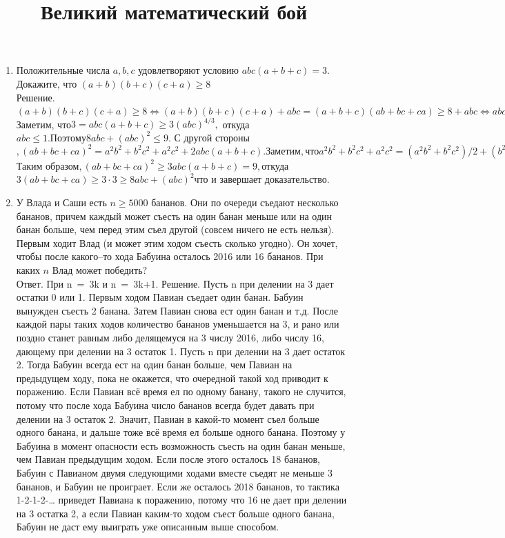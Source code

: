 \documentclass{article}
\title{Великий математический бой}
\date{}
\begin{document}
	\maketitle
	\pagestyle{empty}
	\begin{enumerate}
		\item Положительные числа $a, b, c$ удовлетворяют условию $abc(a+b+c) = 3$. Докажите, что $(a+b)(b+c)(c+a) \ge 8$ \\
		Решение. $(a+b)(b+c)(c+a) \ge  8 \Leftrightarrow (a+b)(b+c)(c+a)+abc = (a+b+c)(ab+bc+ca) \ge 8+abc \Leftrightarrow abc(a+b+c)(ab+bc+ca) = 3(ab+bc+ca) \ge 8abc+(abc)^2.$ Заметим, что$  3 = abc(a+b+c) \ge 3(abc)^{4/3},$ откуда $abc \le 1. Поэтому 8abc+(abc)^2 \le 9.$ С другой стороны$, (ab+bc+ca)^2 = a^2b^2+b^2c^2+a^2c^2+2abc(a+b+c). Заметим, что a^2b^2+b^2c^2+a^2c^2 = (a^2b^2+b^2c^2)/2+(b^2c^2+a^2c^2)/2+(a^2b^2+a^2c^2)/2 \ge ab^2c+bc^2a+ca^2b = abc(a+b+c). $Таким образом$, (ab+bc+ca)^2 \ge 3abc(a+b+c) = 9, $откуда$ 3(ab+bc+ca) \ge 3 \cdot 3 \ge 8abc+ (abc)^2 $что и завершает доказательство.
		\item У Влада и Саши есть $n \ge 5000$ бананов. Они по очереди съедают несколько бананов, причем каждый может съесть на один банан меньше или на один банан больше, чем перед этим съел другой (совсем ничего не есть нельзя). Первым ходит Влад (и может этим ходом съесть сколько угодно). Он хочет, чтобы после какого–то хода Бабуина осталось 2016 или 16 бананов. При каких $n$ Влад может победить?\\
		Ответ. При n = 3k и n = 3k+1. Решение. Пусть n при делении на 3 дает остатки 0 или 1. Первым ходом Павиан съедает один банан. Бабуин вынужден съесть 2 банана. Затем Павиан снова ест один банан и т.д. После каждой пары таких ходов количество бананов уменьшается на 3, и рано или поздно станет равным либо делящемуся на 3 числу 2016, либо числу 16, дающему при делении на 3 остаток 1. Пусть n при делении на 3 дает остаток 2. Тогда Бабуин всегда ест на один банан больше, чем Павиан на предыдущем ходу, пока не окажется, что очередной такой ход приводит к поражению. Если Павиан всё время ел по одному банану, такого не случится, потому что после хода Бабуина число бананов всегда будет давать при делении на 3 остаток 2. Значит, Павиан в какой-то момент съел больше одного банана, и дальше тоже всё время ел больше одного банана. Поэтому у Бабуина в момент опасности есть возможность съесть на один банан меньше, чем Павиан предыдущим ходом. Если после этого осталось 18 бананов, Бабуин с Павианом двумя следующими ходами вместе съедят не меньше 3 бананов, и Бабуин не проиграет. Если же осталось 2018 бананов, то тактика 1-2-1-2-… приведет Павиана к поражению, потому что 16 не дает при делении на 3 остатка 2, а если Павиан каким-то ходом съест больше одного банана, Бабуин не даст ему выиграть уже описанным выше способом.

\end{enumerate}
\end{document}
